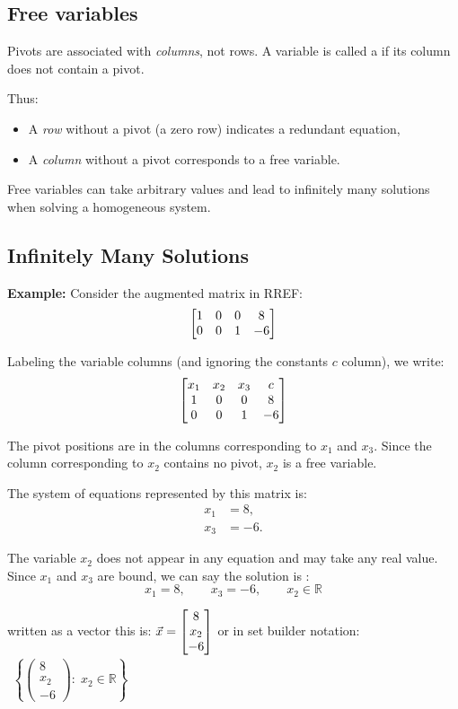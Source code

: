 \subsection{Free variables}
Pivots are associated with \emph{columns}, not rows.  
A variable is called a  if its column does not contain a pivot.

Thus:
\begin{itemize}
    \item A \emph{row} without a pivot (a zero row) indicates a redundant equation,
    \item A \emph{column} without a pivot corresponds to a free variable.
\end{itemize}

Free variables can take arbitrary values and lead to infinitely many solutions when solving a homogeneous system.
\subsection{Infinitely Many Solutions}
\textbf{Example:}
Consider the augmented matrix in RREF:
\[
\begin{bmatrix} 1 & 0 & 0 & 8\\
      0 & 0 & 1 & -6 \end{bmatrix}
\]

Labeling the variable columns (and ignoring the constants $c$ column), we write:
\[
\begin{bmatrix} x_1 & x_2 & x_3 & c\\
      1   & 0   & 0   & 8\\
      0   & 0   & 1   & -6 \end{bmatrix}
\]

The pivot positions are in the columns corresponding to \(x_1\) and \(x_3\).  
Since the column corresponding to \(x_2\) contains no pivot, \(x_2\) is a free variable.

The system of equations represented by this matrix is:
\[
\begin{aligned}
x_1 &= 8,\\
x_3 &= -6.
\end{aligned}
\]

The variable \(x_2\) does not appear in any equation and may take any real value.  
Since $x_1$ and $x_3$ are bound, we can say the solution is :
$$x_1 = 8,\qquad x_3 = -6,\qquad x_2 \in \mathbb{R}$$

written as a vector this is: $\vec{x} = \begin{bmatrix} 8 \\ x_2 \\ -6 \end{bmatrix}$
or in set builder notation:
$\begin{array}{c} \left\{
\begin{pmatrix}
8\\
x_2\\
-6
\end{pmatrix}
:\; x_2 \in \mathbb{R}
\right\} \end{array}$

